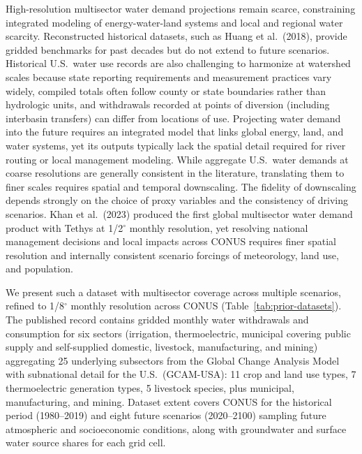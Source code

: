 \documentclass[fleqn,10pt]{wlscirep}
\begin{document}
High-resolution multisector water demand projections remain scarce, constraining integrated modeling of energy-water-land systems and local and regional water scarcity. Reconstructed historical datasets, such as Huang et al.\ (2018)\cite{Huang2018}, provide gridded benchmarks for past decades but do not extend to future scenarios. Historical U.S.\ water use records are also challenging to harmonize at watershed scales because state reporting requirements and measurement practices vary widely, compiled totals often follow county or state boundaries rather than hydrologic units, and withdrawals recorded at points of diversion (including interbasin transfers) can differ from locations of use\cite{naseri2025united,Luukkonen2025JAWRA}. Projecting water demand into the future requires an integrated model that links global energy, land, and water systems, yet its outputs typically lack the spatial detail required for river routing or local management modeling\cite{Wada_2017, van_Vliet_2021}. While aggregate U.S.\ water demands at coarse resolutions are generally consistent in the literature\cite{Zhao_gcamusa_water, naseri2025united, Stets2025USGS}, translating them to finer scales requires spatial and temporal downscaling\cite{hess-17-4555-2013, van_Vliet_2021, Jones_2024}. The fidelity of downscaling depends strongly on the choice of proxy variables and the consistency of driving scenarios. Khan et al.\ (2023)\cite{Khan2023} produced the first global multisector water demand product with Tethys at 1/2$^{\circ}$ monthly resolution, yet resolving national management decisions and local impacts across CONUS requires finer spatial resolution and internally consistent scenario forcings of meteorology, land use, and population.

We present such a dataset with multisector coverage across multiple scenarios, refined to 1/8$^{\circ}$ monthly resolution across CONUS (Table~\ref{tab:prior-datasets}). The published record contains gridded monthly water withdrawals and consumption for six sectors (irrigation, thermoelectric, municipal covering public supply and self-supplied domestic, livestock, manufacturing, and mining) aggregating 25 underlying subsectors from the Global Change Analysis Model with subnational detail for the U.S.\ (GCAM-USA\cite{Calvin2019GCAM,Binsted_2022,Zhao_gcamusa_water,Zhao2024}): 11 crop and land use types, 7 thermoelectric generation types, 5 livestock species, plus municipal, manufacturing, and mining. Dataset extent covers CONUS for the historical period (1980--2019) and eight future scenarios (2020--2100) sampling future atmospheric and socioeconomic conditions, along with groundwater and surface water source shares for each grid cell.
\end{document}
